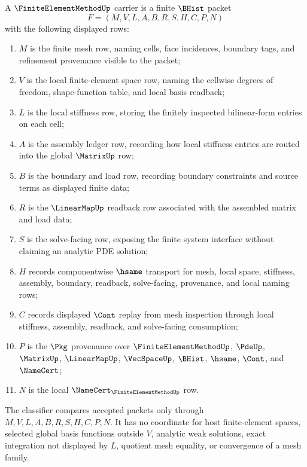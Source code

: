 \begin{definition}
\label{def:finite-element-method-carrier}
A $\FiniteElementMethodUp$ carrier is a finite $\BHist$ packet
$$
F=(M,V,L,A,B,R,S,H,C,P,N)
$$
with the following displayed rows:
\begin{enumerate}
\item $M$ is the finite mesh row, naming cells, face incidences, boundary tags, and refinement provenance visible to the packet;
\item $V$ is the local finite-element space row, naming the cellwise degrees of freedom, shape-function table, and local basis readback;
\item $L$ is the local stiffness row, storing the finitely inspected bilinear-form entries on each cell;
\item $A$ is the assembly ledger row, recording how local stiffness entries are routed into the global $\MatrixUp$ row;
\item $B$ is the boundary and load row, recording boundary constraints and source terms as displayed finite data;
\item $R$ is the $\LinearMapUp$ readback row associated with the assembled matrix and load data;
\item $S$ is the solve-facing row, exposing the finite system interface without claiming an analytic PDE solution;
\item $H$ records componentwise $\hsame$ transport for mesh, local space, stiffness, assembly, boundary, readback, solve-facing, provenance, and local naming rows;
\item $C$ records displayed $\Cont$ replay from mesh inspection through local stiffness, assembly, readback, and solve-facing consumption;
\item $P$ is the $\Pkg$ provenance over $\FiniteElementMethodUp$, $\PdeUp$, $\MatrixUp$, $\LinearMapUp$, $\VecSpaceUp$, $\BHist$, $\hsame$, $\Cont$, and $\NameCert$;
\item $N$ is the local $\NameCert_{\FiniteElementMethodUp}$ row.
\end{enumerate}
The classifier compares accepted packets only through $M,V,L,A,B,R,S,H,C,P,N$. It has no coordinate for host finite-element spaces, selected global basis functions outside $V$, analytic weak solutions, exact integration not displayed by $L$, quotient mesh equality, or convergence of a mesh family.
\end{definition}

